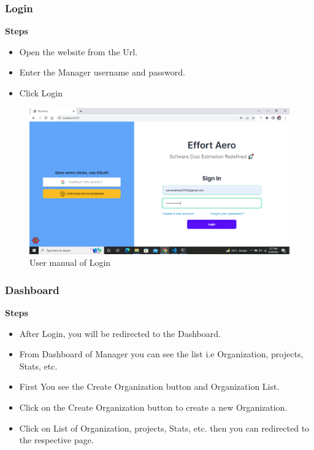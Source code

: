 \subsubsection{Login}
\textbf{Steps}
\begin{itemize}
    \item Open the website from the Url.
    \item Enter the Manager username and password.
    \item Click Login
\end{itemize}
\begin{figure}[H]
    \centering
    \includegraphics[scale=0.4]{./diagrams/user-manual/Screenshot (17).png}
    \caption{User manual of Login}
    \label{fig:user-1}

\end{figure}

\subsubsection{Dashboard}
\textbf{Steps}
\begin{itemize}
    \item After Login, you will be redirected to the Dashboard.
    \item From Dashboard of Manager you can see the list i.e Organization, projects, Stats, etc.
    \item First You see the Create Organization button and Organization List.
    \item Click on the Create Organization button to create a new Organization.
    \item Click on List of Organization, projects, Stats, etc. then you can redirected to the respective page.
\end{itemize}

